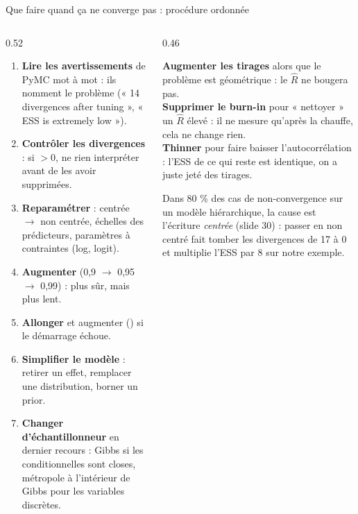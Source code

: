 \begin{frame}{Que faire quand ça ne converge pas : procédure ordonnée}
\footnotesize
\begin{columns}[t]
\begin{column}{0.52\textwidth}
\begin{abox}
\begin{enumerate}
  \item \textbf{Lire les avertissements} de PyMC mot à mot : ils nomment le
        problème (« 14 divergences after tuning », « ESS is extremely low »).
  \item \textbf{Contrôler les divergences} : si $> 0$, ne rien interpréter
        avant de les avoir supprimées.
  \item \textbf{Reparamétrer} : centrée $\rightarrow$ non centrée, échelles des
        prédicteurs, paramètres à contraintes (log, logit).
  \item \textbf{Augmenter } (0,9 $\rightarrow$ 0,95
        $\rightarrow$ 0,99) : plus sûr, mais plus lent.
  \item \textbf{Allonger } et augmenter  () si
        le démarrage échoue.
  \item \textbf{Simplifier le modèle} : retirer un effet, remplacer une
        distribution, borner un prior.
  \item \textbf{Changer d'échantillonneur} en dernier recours : Gibbs si les
        conditionnelles sont closes, métropole à l'intérieur de Gibbs pour les
        variables discrètes.
\end{enumerate}
\end{abox}
\end{column}
\begin{column}{0.46\textwidth}
\begin{wbox}
\nok{} \textbf{Augmenter les tirages} alors que le problème est géométrique :
le $\hat R$ ne bougera pas.\\[1mm]
\nok{} \textbf{Supprimer le burn-in} pour « nettoyer » un $\hat R$ élevé :
il ne mesure qu'après la chauffe, cela ne change rien.\\[1mm]
\nok{} \textbf{Thinner} pour faire baisser l'autocorrélation : l'ESS de ce qui
reste est identique, on a juste jeté des tirages.
\end{wbox}
\begin{kbox}
Dans 80 \% des cas de non-convergence sur un modèle hiérarchique, la cause est
l'écriture \emph{centrée} (slide 30) : passer en non centré fait tomber les
divergences de 17 à 0 et multiplie l'ESS par 8 sur notre exemple.
\end{kbox}
\end{column}
\end{columns}
\end{frame}

